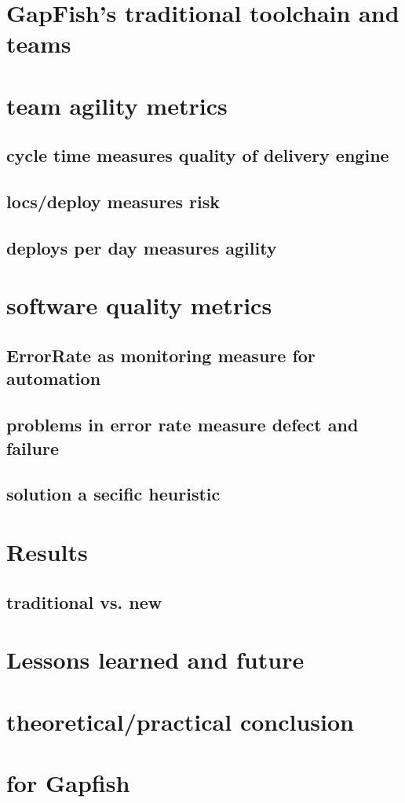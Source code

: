 \chapter{GapFish's traditional toolchain and teams}
\chapter{team agility metrics}
\section{cycle time measures quality of delivery engine}
\section{locs/deploy measures risk}
\section{deploys per day measures agility}
\chapter{software quality metrics}
\section{ErrorRate as monitoring measure for automation}
\section{problems in error rate measure defect and failure}
\section{solution a secific heuristic}
\chapter{Results}
\section{traditional vs. new}
\chapter{Lessons learned and future}

\chapter{theoretical/practical conclusion}
\chapter{for Gapfish}
